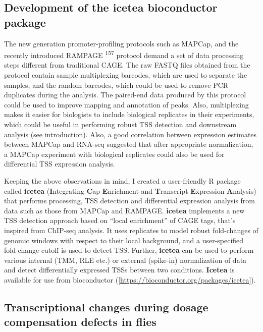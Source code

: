 \documentclass[11pt,twoside]{MPIthesis}
\theoremstyle{definition}
\theoremstyle{definition}
\theoremstyle{definition}
\theoremstyle{remark}
\begin{document}
\subsection{Development of the icetea bioconductor
package}\label{development-of-the-icetea-bioconductor-package}

The new generation promoter-profiling protocols such as MAPCap, and the
recently introduced RAMPAGE \textsuperscript{157} protocol demand a set
of data processing steps different from traditional CAGE. The raw FASTQ
files obtained from the protocol contain sample multiplexing barcodes,
which are used to separate the samples, and the random barcodes, which
could be used to remove PCR duplicates during the analysis. The
paired-end data produced by this protocol could be used to improve
mapping and annotation of peaks. Also, multiplexing makes it easier for
biologists to include biological replicates in their experiments, which
could be useful in performing robust TSS detection and downstream
analysis (see introduction). Also, a good correlation between expression
estimates between MAPCap and RNA-seq suggested that after appropriate
normalization, a MAPCap experiment with biological replicates could also
be used for differential TSS expression analysis.

Keeping the above observations in mind, I created a user-friendly R
package called \textbf{icetea} (\textbf{I}ntegrating \textbf{C}ap
\textbf{E}nrichment and \textbf{T}ranscript \textbf{E}xpression
\textbf{A}nalysis) that performs processing, TSS detection and
differential expression analysis from data such as those from MAPCap and
RAMPAGE. \textbf{icetea} implements a new TSS detection approach based
on ``local enrichment'' of CAGE tags, that's inspired from ChIP-seq
analysis. It uses replicates to model robust fold-changes of genomic
windows with respect to their local background, and a user-specified
fold-change cutoff is used to detect TSS. Further, \textbf{icetea} can
be used to perform various internal (TMM, RLE etc.) or external
(spike-in) normalization of data and detect differentially expressed
TSSs between two conditions. \textbf{Icetea} is available for use from
bioconductor ({[}{\url{https://bioconductor.org/packages/icetea}}{]}).

\subsection{Transcriptional changes during dosage compensation defects
in
flies}\label{transcriptional-changes-during-dosage-compensation-defects-in-flies}
\end{document}
